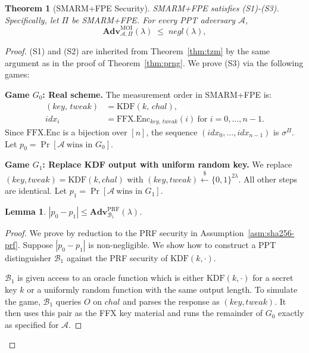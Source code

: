 \documentclass[journal]{IEEEtran}
\newcommand{\rtsmarmtwo}{SMARM+FPE\xspace}
\newtheorem{lemma}{Lemma}[section]
\newtheorem{theorem}{Theorem}[section]
\newcommand{\Adv}{\mathbf{Adv}}
\begin{document}
\begin{theorem}[\rtsmarmtwo Security]
\label{thm:fpe}
\rtsmarmtwo satisfies (S1)-(S3).
Specifically, let $\Pi$ be \rtsmarmtwo.
For every PPT adversary $\mathcal{A}$,
\[
  \Adv^{\mathrm{MOI}}_{\mathcal{A},\Pi}(\lambda) \;\leq\; \mathit{negl}(\lambda),
\]
\end{theorem}

\begin{proof}
(S1) and (S2) are inherited from Theorem~\ref{thm:tzm} by the same
argument as in the proof of Theorem~\ref{thm:prng}.
We prove (S3) via the following games:
 
\medskip
\noindent\textbf{Game $G_0$: Real scheme.}
The measurement order in \rtsmarmtwo is:
\begin{align*}
  (\mathit{key},\, \mathit{tweak})
      &= \mathrm{KDF}(k,\, \mathit{chal}), \\
  \mathit{idx}_i
      &= \mathrm{FFX.Enc}_{\mathit{key},\,\mathit{tweak}}(i)
         \ \text{for } i = 0,\dots,n-1.
\end{align*}
Since $\mathrm{FFX.Enc}$ is a bijection over $[n]$, the sequence
$(\mathit{idx}_0,\dots,\mathit{idx}_{n-1})$ is $\sigma^\Pi$.
Let $p_0 = \Pr[\mathcal{A}\ \text{wins in }G_0]$.
 
\medskip
\noindent\textbf{Game $G_1$: Replace KDF output with uniform random key.}
We replace $(\mathit{key},\mathit{tweak}) = \mathrm{KDF}(k,\mathit{chal})$
with $(\mathit{key},\mathit{tweak}) \xleftarrow{\$} \{0,1\}^{2\lambda}$.
All other steps are identical.
Let $p_1 = \Pr[\mathcal{A}\ \text{wins in }G_1]$.
 
\begin{lemma}
\label{lem:fpe-g0-g1}
$|p_0 - p_1| \leq \Adv^{\mathrm{PRF}}_{\mathcal{B}_1}(\lambda)$.
\end{lemma}
\begin{proof}
We prove by reduction to the PRF security in Assumption~\ref{asm:sha256-prf}.
Suppose $|p_0 - p_1|$ is non-negligible.
We show how to construct a PPT distinguisher $\mathcal{B}_1$ against the PRF security of
$\mathrm{KDF}(k,\cdot)$.

$\mathcal{B}_1$ is given access to an oracle function
which is either $\mathrm{KDF}(k,\cdot)$ for a secret key $k$ or a uniformly random
function with the same output length.
To simulate the game, $\mathcal{B}_1$ queries $O$ on
$\mathit{chal}$ and parses the response as
$(\mathit{key},\mathit{tweak})$.
It then uses this pair as the FFX key material and runs the remainder of
$G_0$ exactly as specified for $\mathcal{A}$.


\end{proof}
\end{proof}
\end{document}
